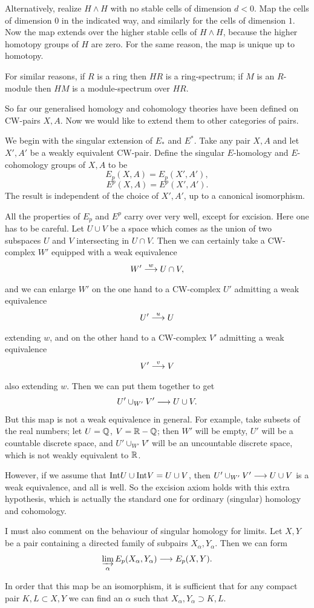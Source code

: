 \documentclass[../main]{subfiles}
\begin{document}
Alternatively, realize $H \wedge H$ with no stable cells of dimension $d < 0$. Map the cells of dimension $0$ in the indicated way, and similarly for the cells of dimension $1$. Now the map extends over the higher stable cells of $H \wedge H$, because the higher homotopy groups of $H$ are zero. For the same reason, the map is unique up to homotopy.

For similar reasons, if $R$ is a ring then $HR$ is a ring-spectrum; if $M$ is an $R$-module then $HM$ is a module-spectrum over $HR$.

So far our generalised homology and cohomology theories have been defined on CW-pairs $X,A$. Now we would like to extend them to other categories of pairs.

We begin with the singular extension of $E_*$ and $E^*$. Take any pair $X,A$ and let $X',A'$ be a weakly equivalent CW-pair. Define the singular $E$-homology and $E$-cohomology groups of $X,A$ to be
\[E_p(X,A) = E_p(X',A'),\]
\[E^p(X,A) = E^p(X',A').\]
The result is independent of the choice of $X',A'$, up to a canonical isomorphism.

All the properties of $E_p$ and $E^p$ carry over very well, except for excision. Here one has to be careful. Let $U \cup V$ be a space which comes as the union of two subspaces $U$ and $V$ intersecting in $U \cap V$. Then we can certainly take a CW-complex $W'$ equipped with a weak equivalence
\[W' \lar{w}U \cap V,\]
and we can enlarge $W'$ on the one hand to a CW-complex $U'$ admitting a weak equivalence 
\[U' \lar{u} U\]
extending $w$, and on the other hand to a CW-complex $V'$ admitting a weak equivalence 
\[V' \lar{v} V\]
also extending $w$. Then we can put them together to get
\[U' \cup_{W'} V' \longrightarrow  U \cup V.\]
But this map is not a weak equivalence in general. For example, take subsets of the real numbers; let $U = \mathbb{Q}$, $V=\mathbb{R} - \mathbb{Q}$; then $W'$ will be empty, $U'$ will be a countable discrete space, and $U' \cup_{W'} V'$ will be an uncountable discrete space, which is not weakly equivalent to $\mathbb{R}$.

However, if we assume that $\mathrm{Int} U \cup \mathrm{Int} V = U \cup V$, then $U' \cup_{W'} V' \longrightarrow U \cup V$ is a weak equivalence, and all is well. So the excision axiom holds with this extra hypothesis, which is actually the standard one for ordinary (singular) homology and cohomology.

I must also comment on the behaviour of singular homology for limits. Let $X,Y$ be a pair containing a directed family of subpairs $X_\alpha,Y_\alpha$. Then we can form
\[\varinjlim_\alpha E_p(X_\alpha,Y_\alpha) \longrightarrow E_p(X,Y).\]
\begin{proposition}\label{prop:p3c10.1}
In order that this map be an isomorphism, it is sufficient that for any compact pair $K,L \subset X,Y$ we can find an $\alpha$ such that $X_\alpha,Y_\alpha \supset K,L$.
\end{proposition}
\end{document}
